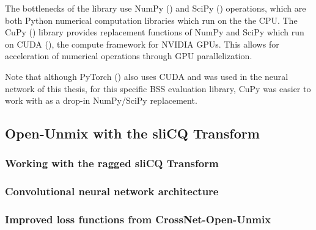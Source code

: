 \documentclass[report.tex]{subfiles}
\begin{document}
The bottlenecks of the library use NumPy (\cite{numpy}) and SciPy (\cite{scipy}) operations, which are both Python numerical computation libraries which run on the the CPU. The CuPy (\cite{cupy}) library provides replacement functions of NumPy and SciPy which run on CUDA (\cite{cuda}), the compute framework for NVIDIA GPUs. This allows for acceleration of numerical operations through GPU parallelization.

Note that although PyTorch (\cite{pytorch}) also uses CUDA and was used in the neural network of this thesis, for this specific BSS evaluation library, CuPy was easier to work with as a drop-in NumPy/SciPy replacement.

\subsection{Open-Unmix with the sliCQ Transform}
\label{sec:slicqumx}



\subsubsection{Working with the ragged sliCQ Transform}


\subsubsection{Convolutional neural network architecture}


\subsubsection{Improved loss functions from CrossNet-Open-Unmix}
\end{document}
